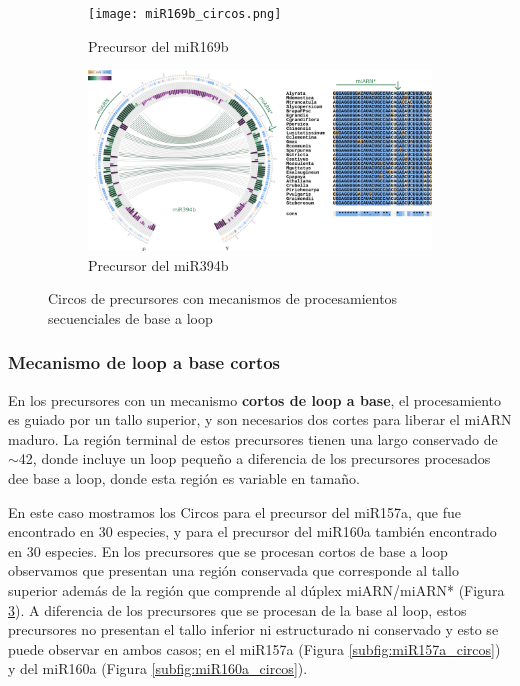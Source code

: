 \begin{landscape}
	\begin{figure}
	\centering
	\begin{subfigure}{.75\textwidth}
	  \centering
	  \texttt{[image: miR169b\_circos.png]}
	  \caption{Precursor del miR169b}
	  \label{subfig:miR169b_circos}
	\end{subfigure}%
	\begin{subfigure}{.75\textwidth}
	  \centering
	  \includegraphics[width=.9\linewidth]{miR394b_circos.png}
	  \caption{Precursor del miR394b}
	  \label{subfig:miR394b_circos}
	\end{subfigure}
	\caption{Circos de precursores con mecanismos de procesamientos secuenciales de base a loop}
	\label{fig:seqBTL_circos}
	\end{figure}
\end{landscape}


\subsubsection{Mecanismo de loop a base cortos}

En los precursores con un mecanismo \textbf{cortos de loop a base}, el procesamiento es guiado por un tallo superior, y son necesarios dos cortes para liberar el miARN maduro.
La región terminal de estos precursores tienen una largo conservado de $\sim$42, donde incluye un loop pequeño \citep{Bologna2013} a diferencia de los precursores procesados dee base a loop, donde esta región es variable en tamaño.

En este caso mostramos los Circos para el precursor del miR157a, que fue encontrado en 30 especies, y para el precursor del miR160a también encontrado en 30 especies. 
En los precursores que se procesan cortos de base a loop observamos que presentan una región conservada que corresponde al tallo superior además de la región que comprende al dúplex miARN/miARN* (Figura \ref{fig:seqBTL_circos}).
A diferencia de los precursores que se procesan de la base al loop, estos precursores no presentan el tallo inferior ni estructurado ni conservado y esto se puede observar en ambos casos; en el miR157a (Figura \ref{subfig:miR157a_circos}) y del miR160a (Figura \ref{subfig:miR160a_circos}).


